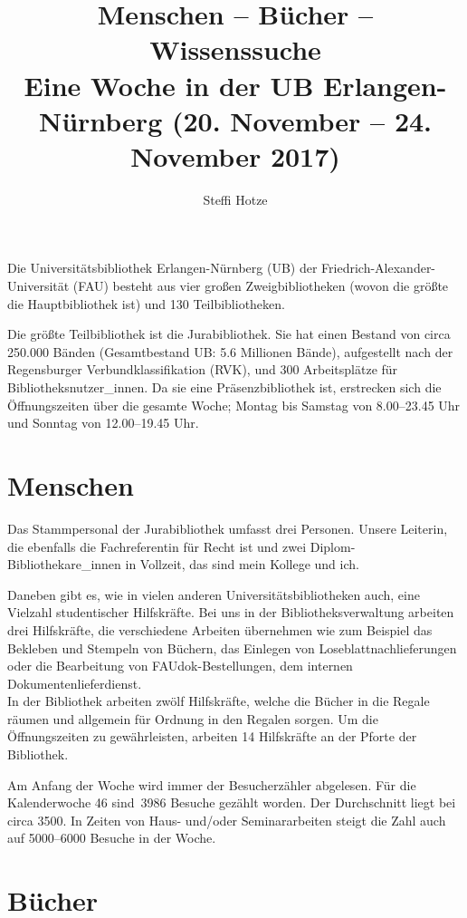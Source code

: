 \documentclass[a4paper,
fontsize=11pt,
oneside,
numbers=noperiodatend,
parskip=half-,
bibliography=totoc,
final
]{scrartcl}
\title{\LARGE{Menschen -- Bücher -- Wissenssuche \\
Eine Woche in der UB Erlangen-Nürnberg (20. November – 24. November 2017)}} %
\author{Steffi Hotze} %
\date{}
\begin{document}
\maketitle
\thispagestyle{fancyplain} 


Die Universitätsbibliothek Erlangen-Nürnberg (UB) der
Friedrich-Alexander-Universität (FAU) besteht aus vier großen
Zweigbibliotheken (wovon die größte die Hauptbibliothek ist) und 130
Teilbibliotheken.

Die größte Teilbibliothek ist die Jurabibliothek. Sie hat einen Bestand
von circa 250.000 Bänden (Gesamtbestand UB: 5.6 Millionen Bände),
aufgestellt nach der Regensburger Verbundklassifikation (RVK), und 300
Arbeitsplätze für Bibliotheksnutzer\_innen. Da sie eine
Präsenzbibliothek ist, erstrecken sich die Öffnungszeiten über die
gesamte Woche; Montag bis Samstag von 8.00--23.45 Uhr und Sonntag von
12.00--19.45 Uhr.

\hypertarget{menschen}{%
\section*{Menschen}\label{menschen}}

Das Stammpersonal der Jurabibliothek umfasst drei Personen. Unsere
Leiterin, die ebenfalls die Fachreferentin für Recht ist und zwei
Diplom-Bibliothekare\_innen in Vollzeit, das sind mein Kollege und ich.

Daneben gibt es, wie in vielen anderen Universitätsbibliotheken auch,
eine Vielzahl studentischer Hilfskräfte. Bei uns in der
Bibliotheksverwaltung arbeiten drei Hilfskräfte, die verschiedene
Arbeiten übernehmen wie zum Beispiel das Bekleben und Stempeln von
Büchern, das Einlegen von Loseblattnachlieferungen oder die Bearbeitung
von FAUdok-Bestellungen, dem internen Dokumentenlieferdienst. ~\\
In der Bibliothek arbeiten zwölf Hilfskräfte, welche die Bücher in die
Regale räumen und allgemein für Ordnung in den Regalen sorgen. Um die
Öffnungszeiten zu gewährleisten, arbeiten 14 Hilfskräfte an der Pforte
der Bibliothek.

Am Anfang der Woche wird immer der Besucherzähler abgelesen. Für die
Kalenderwoche 46 sind~3986 Besuche gezählt worden. Der Durchschnitt
liegt bei circa 3500. In Zeiten von Haus- und/oder Seminararbeiten
steigt die Zahl auch auf 5000--6000 Besuche in der Woche.

\hypertarget{buxfccher}{%
\section*{Bücher}\label{buxfccher}}
\end{document}
